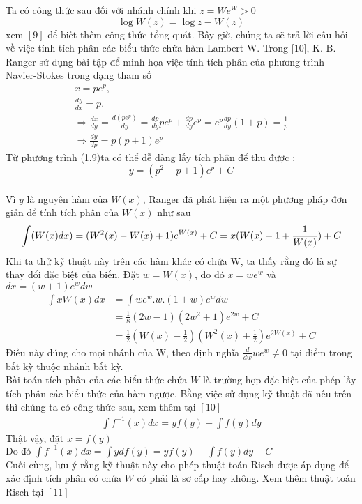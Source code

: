 Ta có công thức sau đối với nhánh chính khi $z = We^{W} > 0 $
$$ \log W(z) = \log z - W(z) $$ xem $[9]$ để biết thêm công thức tổng quát.
Bây giờ, chúng ta sẽ trả lời câu hỏi về việc tính tích phân các biểu thức chứa hàm Lambert W. Trong [10], K. B. Ranger sử dụng bài tập để minh họa việc tính tích phân của phương trình Navier-Stokes trong dạng tham số 
\begin{align}
 x = pe^{p},\\
\frac{dy}{dx} = p. \\
\Rightarrow \frac{dx}{dy} = \frac{d(pe^{p})}{dy} = \frac{dp}{dy}pe^{p} + \frac{dp}{dy}e^{p} = e^{p}\frac{dp}{dy}(1+p) = \frac{1}{p} \nonumber \\
\Rightarrow \frac{dy}{dp} = p(p+1)e^{p} 
\end{align}
Từ phương trình (1.9)ta có thể dễ dàng lấy tích phân để thu được : \\
$$ y = (p^{2} - p + 1)e^{p}  +  C $$\\
Vì $y$ là nguyên hàm của $W(x)$, Ranger đã phát hiện ra một phương pháp đơn giản để tính tích phân của $W(x)$ như sau 
$$ \displaystyle \int(W(x)dx) = (W^2(x) - W(x) +1)e^{W(x)} + C  \\
= x(W(x) - 1 + \frac{1}{W(x)}) + C $$
Khi ta thử kỹ thuật này trên các hàm khác có chứa W, ta thấy rằng đó là sự thay đổi đặc biệt của biến. Đặt $w = W(x)$, do đó $x = we^w$ và $dx = (w+1)e^{w}dw$
\begin{align*}
\displaystyle \int{xW(x)dx} &= \displaystyle \int{we^{w}.w.(1+w)e^{w}dw} \\
&= \frac{1}{8}(2w-1)(2w^{2}+1)e^{2w} + C  \\
&= \frac{1}{2}(W(x)-\frac{1}{2})(W^{2}(x)+\frac{1}{2})e^{2W(x)} + C
\end{align*}
Điều này đúng cho mọi nhánh của W, theo định nghĩa $\frac{d}{dw}we^{w} \neq 0$ tại điểm trong bất kỳ thuộc nhánh bất kỳ. \\
Bài toán tích phân của các biểu thức chứa $W$ là trường hợp đặc biệt của phép lấy tích phân các biểu thức của hàm ngược. Bằng việc sử dụng kỹ thuật đã nêu trên thì chúng ta có công thức sau, xem thêm tại $[10]$
\begin{align*}
\displaystyle \int{f^{-1}(x)dx} = yf(y) -\displaystyle \int{f(y)dy}
\end{align*}
Thật vậy, đặt $x = f(y)$ \\
$\mbox{Do đó } \displaystyle \int{f^{-1}(x)dx} = \displaystyle \int{ydf(y)} = yf(y) - \displaystyle \int{f(y)dy} + C $ \\
Cuối cùng, lưu ý rằng kỹ thuật này cho phép thuật toán Risch được áp dụng để xác định tích phân có chứa $W$ có phải là sơ cấp hay không. Xem thêm thuật toán Risch tại $[11]$
